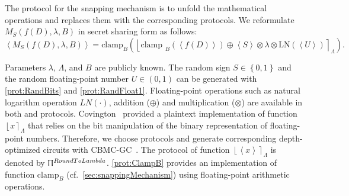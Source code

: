                   The \smpc protocol for the snapping mechanism is to unfold the mathematical operations and replaces them with the corresponding \smpc protocols. We reformulate $M_{S}\left(f\left(D\right),\lambda,B\right)$ in secret sharing form as follows:
                  \begin{equation}
                        \label{eq:snappingMPC}
                        \left\langle M_{S}\left(f\left(D\right) ,\lambda,B\right)\right\rangle =\text{clamp}_{B}\left(\left\lfloor\text {clamp }_{B}\left(\left\langle f\left(D\right)\right\rangle \right) \oplus \left\langle S\right\rangle \otimes \lambda\otimes \text{LN}\left(\left\langle U\right\rangle \right) \right\rceil_{\Lambda}\right).
                  \end{equation}

                  Parameters $\lambda $, $\Lambda$, and $B$ are publicly known. The random sign $ S\in \left\{0,1\right\}$ and the random floating-point number $ U\in \left(0,1\right)  $ can be generated with \autoref{prot:RandBits} and \autoref{prot:RandFloat1}.
                  Floating-point operations such as natural logarithm operation $LN\left(\cdot\right) $, addition ($\oplus$) and multiplication ($\otimes$) are available in both \booleanGMW and \arithmeticGMW protocols.
                  Covington~\cite{Covington2019} provided a plaintext implementation of function $\left\lfloor x\right\rceil_{\Lambda} $ that relies on the bit manipulation of the binary representation of floating-point numbers.
                  Therefore, we choose \booleanGMW protocols and generate corresponding depth-optimized circuits with CBMC-GC~\cite{buscher2016compiling}.
                  The \booleanGMW protocol of function $\left\lfloor \left\langle x\right\rangle \right\rceil_{\Lambda} $ is denoted by $\Uppi^{RoundToLambda}$.
                  \autoref{prot:ClampB} provides an implementation of function $\text{clamp}_{B}$ (cf.~\autoref{sec:snappingMechanism}) using \booleanGMW floating-point arithmetic operations.

